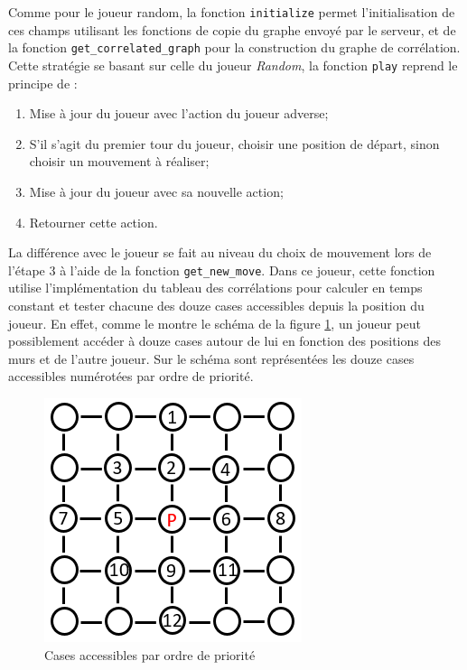 \documentclass[11pt]{article}
\begin{document}
Comme pour le joueur random, la fonction \texttt{initialize} permet l'initialisation de ces champs utilisant les fonctions de copie du graphe envoyé par le serveur, et de la fonction \texttt{get\_correlated\_graph} pour la construction du graphe de corrélation. \\

\noindent Cette stratégie se basant sur celle du joueur \textit{Random}, la fonction \texttt{play} reprend le principe de :
\begin{enumerate}
    \item Mise à jour du joueur avec l'action du joueur adverse;
    \item S'il s'agit du premier tour du joueur, choisir une position de départ, sinon choisir un mouvement à réaliser;
    \item Mise à jour du joueur avec sa nouvelle action;
    \item Retourner cette action.
\end{enumerate}

La différence avec le joueur se fait au niveau du choix de mouvement lors de l'étape $3$ à l'aide de la fonction \texttt{get\_new\_move}.
Dans ce joueur, cette fonction utilise l'implémentation du tableau des corrélations pour calculer en temps constant et tester chacune des douze cases accessibles depuis la position du joueur.
En effet, comme le montre le schéma de la figure \ref{fig:douzecases}, un joueur peut possiblement accéder à douze cases autour de lui en fonction des positions des murs et de l'autre joueur. Sur le schéma sont représentées les douze cases accessibles numérotées par ordre de priorité.

\begin{figure}[H]
    \centering
    \includegraphics[scale = 0.4]{douzecases.png}
    \caption{Cases accessibles par ordre de priorité}
    \label{fig:douzecases}
\end{figure}
\end{document}
